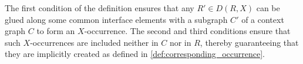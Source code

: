 \begin{definition}
\begin{minipage}{0.29\textwidth}
{
        }
    \end{minipage}
\end{definition}  
The first condition of the definition ensures that any $R' \in D(R,X)$ can be glued along some common interface elements with a subgraph $C'$ of a context graph \( C \) to form an \( X \)-occurrence. The second and third conditions ensure that such $X$-occurrences are included neither in \( C \) nor in \( R \), thereby guaranteeing that they are implicitly created as defined in \autoref{def:corresponding_occurrence}.

